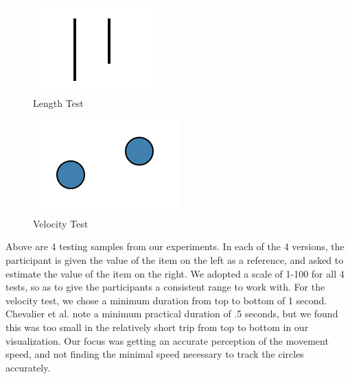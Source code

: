 \documentclass{article}
\begin{document}
\begin{multicols}{2}
\begin{figure}[H]
    \centering
    \includegraphics[width=\columnwidth]{Length}
    \caption{Length Test}
    \label{fig:Length}
\end{figure}

\begin{figure}[H]
    \centering
    \includegraphics[width=\columnwidth]{Velocity}
    \caption{Velocity Test}
    \label{fig:Velocity}
\end{figure}

Above are 4 testing samples from our experiments. In each of the 4 versions, the participant is given the value of the item on the left as a reference, and asked to estimate the value of the item on the right. We adopted a scale of 1-100 for all 4 tests, so as to give the participants a consistent range to work with. For the velocity test, we chose a minimum duration from top to bottom of 1 second. Chevalier et al. note a minimum practical duration of .5 seconds, but we found this was too small in the relatively short trip from top to bottom in our visualization. \citep{chevalier2014not} Our focus was getting an accurate perception of the movement speed, and not finding the minimal speed necessary to track the circles accurately. 


\end{multicols}
\end{document}
